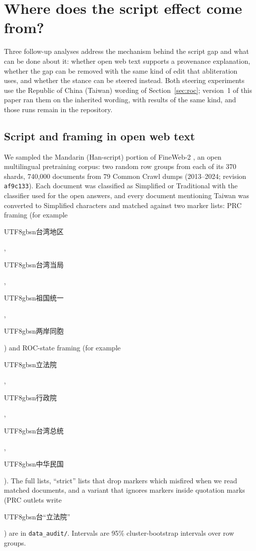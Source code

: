 \documentclass[11pt,a4paper]{article}
\newcommand{\zhs}[1]{\begin{CJK}{UTF8}{gbsn}#1\end{CJK}}
\begin{document}
\section{Where does the script effect come from?}\label{sec:source}

Three follow-up analyses address the mechanism behind the script gap and what can be done about it: whether open
web text supports a provenance explanation, whether the gap can be removed with the same kind of edit that abliteration
uses, and whether the stance can be steered instead. Both steering experiments use the Republic of China (Taiwan)
wording of Section~\ref{sec:roc}; version~1 of this paper ran them on the inherited wording, with results of the same
kind, and those runs remain in the repository.

\subsection{Script and framing in open web text}\label{sec:corpus}

We sampled the Mandarin (Han-script) portion of FineWeb-2 \citep{penedo2025fineweb2}, an open multilingual pretraining
corpus: two random row groups from each of its 370 shards, 740,000 documents from 79 Common Crawl dumps (2013--2024;
revision \texttt{af9c133}). Each document was classified as Simplified or Traditional with the classifier used for the
open answers, and every document mentioning Taiwan was converted to Simplified characters and matched against two marker
lists: PRC framing (for example \zhs{台湾地区}, \zhs{台湾当局}, \zhs{祖国统一}, \zhs{两岸同胞}) and ROC-state framing
(for example \zhs{立法院}, \zhs{行政院}, \zhs{台湾总统}, \zhs{中华民国}). The full lists, ``strict'' lists that drop markers
which misfired when we read matched documents, and a variant that ignores markers inside quotation marks (PRC outlets
write \zhs{台“立法院”}) are in \texttt{data\_audit/}. Intervals are 95\% cluster-bootstrap intervals over row groups.
\end{document}
